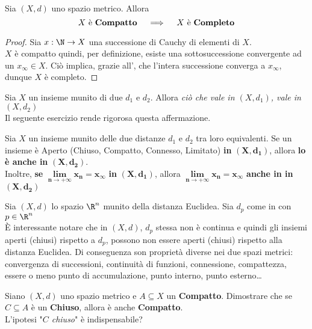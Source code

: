 \begin{proposition}
	\label{prop:X_compat_allora_X_compl}
	Sia $(X,d)$ uno spazio metrico. Allora
	\[X \text{ è \textbf{Compatto}} \quad \implies \quad X \text{ è \textbf{Completo}}\]
	\begin{proof}
		Sia $x: \N \to X$ una successione di Cauchy di elementi di $X$.\\
		$X$ è compatto quindi, per definizione, esiste una sottosuccessione convergente ad un $x_\infty \in X$. Ciò implica, grazie all', che l'intera successione converga a $x_\infty$, dunque $X$ è completo.
	\end{proof}
\end{proposition}

\begin{observation}
	Sia $X$ un insieme munito di due  $d_1$ e $d_2$. Allora \textit{ciò che vale in $(X, d_1)$, vale in $(X, d_2)$}\\
	Il seguente esercizio rende rigorosa questa affermazione.
\end{observation}
\begin{exercise}
	\label{ex:dist_eqiv}
	Sia $X$ un insieme munito delle due distanze $d_1$ e $d_2$ tra loro equivalenti. Se un insieme è Aperto (Chiuso, Compatto, Connesso, Limitato) \textbf{in} $\boldsymbol{(X,d_1)}$, allora \textbf{lo è anche in} $\boldsymbol{(X,d_2)}$.\\
	Inoltre, \textbf{se} $\boldsymbol{\lim\limits_{n \to +\infty} x_n = x_\infty}$ \textbf{in} $\boldsymbol{(X,d_1)}$, allora $\boldsymbol{\lim\limits_{n \to +\infty} x_n = x_\infty}$ \textbf{anche in in} $\boldsymbol{(X,d_2)}$
\end{exercise}
\begin{example}
	Sia $(X,d)$ lo spazio $\R^n$ munito della distanza Euclidea. Sia $d_p$ come in \hyperref[ex:dist_parigi]{} con $p \in \R^n$\\
	È interessante notare che in $(X,d)$, $d_p$ stessa non è continua e quindi gli insiemi aperti (chiusi) rispetto a $d_p$, possono non essere aperti (chiusi) rispetto alla distanza Euclidea. Di conseguenza son proprietà diverse nei due spazi metrici: convergenza di successioni, continuità di funzioni, connessione, compattezza, essere o meno punto di accumulazione, punto interno, punto esterno\dots
\end{example}
\begin{exercise}
	Siano $(X,d)$ uno spazio metrico e $A \subseteq X$ un \textbf{Compatto}. Dimostrare che se $C \subseteq A$ è un \textbf{Chiuso}, allora è anche \textbf{Compatto}.\\
	L'ipotesi "\textit{$C$ chiuso}" è indispensabile?
\end{exercise}

